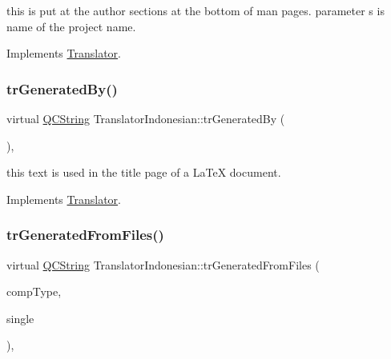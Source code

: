 this is put at the author sections at the bottom of man pages. parameter s is name of the project name. 

Implements \mbox{\hyperlink{class_translator}{Translator}}.

\mbox{\label{class_translator_indonesian_a2061ccd00e4059ede6eb184d2c4829ee}} 
\subsubsection{\texorpdfstring{trGeneratedBy()}{trGeneratedBy()}}
{\footnotesize\ttfamily virtual \mbox{\hyperlink{class_q_c_string}{Q\+C\+String}} Translator\+Indonesian\+::tr\+Generated\+By (\begin{DoxyParamCaption}{ }\end{DoxyParamCaption})\hspace{0.3cm}{\ttfamily [inline]}, {\ttfamily [virtual]}}

this text is used in the title page of a La\+TeX document. 

Implements \mbox{\hyperlink{class_translator}{Translator}}.

\mbox{\label{class_translator_indonesian_a4318dda4cefe54d46ef765d389a62577}} 
\subsubsection{\texorpdfstring{trGeneratedFromFiles()}{trGeneratedFromFiles()}}
{\footnotesize\ttfamily virtual \mbox{\hyperlink{class_q_c_string}{Q\+C\+String}} Translator\+Indonesian\+::tr\+Generated\+From\+Files (\begin{DoxyParamCaption}\item[{\mbox{\hyperlink{class_class_def_ae70cf86d35fe954a94c566fbcfc87939}{Class\+Def\+::\+Compound\+Type}}}]{comp\+Type,  }\item[{bool}]{single }\end{DoxyParamCaption})\hspace{0.3cm}{\ttfamily [inline]}, {\ttfamily [virtual]}}

